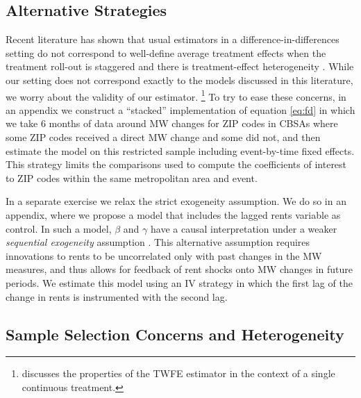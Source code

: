 
\subsection{Alternative Strategies}\label{sec:alt_emp_strategies}

Recent literature has shown that usual estimators in a difference-in-differences 
setting do not correspond to well-define average treatment effects when the 
treatment roll-out is staggered and there is treatment-effect heterogeneity 
\parencite{deChaisemartinEtAl2022,RothEtAl2022}.
While our setting does not correspond exactly to the models discussed in this
literature, we worry about the validity of our estimator.%
\footnote{\textcite[][Section 3.4]{CallawayEtAl2021} discusses the properties 
of the TWFE estimator in the context of a single continuous treatment.}
To try to ease these concerns, in an appendix we construct a ``stacked'' 
implementation of equation \eqref{eq:fd} in which we take 6 months of data 
around MW changes for ZIP codes in CBSAs where some ZIP codes received a direct 
MW change and some did not, 
and then estimate the model on this restricted sample including event-by-time 
fixed effects.
This strategy limits the comparisons used to compute the coefficients of 
interest to ZIP codes within the same metropolitan area and event.

In a separate exercise we relax the strict exogeneity assumption.
We do so in an appendix, where we propose a model that includes the lagged 
rents variable as control.
In such a model, $\beta$ and $\gamma$ have a causal interpretation under a 
weaker \textit{sequential exogeneity} assumption
\parencite{ArellanoBond1991, ArellanoHonore2001}.
This alternative assumption requires innovations to rents to be uncorrelated 
only with past changes in the MW measures, and thus allows for feedback of 
rent shocks onto MW changes in future periods.
We estimate this model using an IV strategy in which the first lag of the change
in rents is instrumented with the second lag.


\subsection{Sample Selection Concerns and Heterogeneity}\label{sec:emp_start_heterogeneity}

